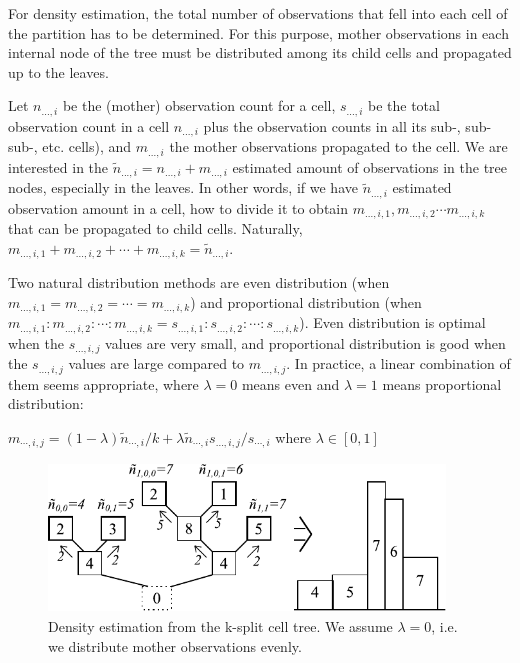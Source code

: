 For density estimation, the total number of observations that
fell into each cell of the partition has to be determined. For
this purpose, mother observations in each internal node of the
tree must be distributed among its child cells and propagated
up to the leaves.


Let $n_{...,i}$ be the (mother) observation count for a cell,
$s_{...,i}$ be the total observation count in a cell $n_{...,i}$ plus
the observation counts in all its sub-, sub-sub-, etc. cells), and
$m_{...,i}$ the mother observations propagated to the cell. We are
interested in the $\tilde{n}_{...,i} = n_{...,i} + m_{...,i}$
estimated amount of observations in the tree nodes, especially in the
leaves. In other words, if we have $\tilde{n}_{...,i}$ estimated
observation amount in a cell, how to divide it to obtain
$m_{...,i,1}, m_{...,i,2} \cdots m_{...,i,k}$
that can be propagated to child cells. Naturally,
$m_{...,i,1} + m_{...,i,2} + \cdots + m_{...,i,k} = \tilde{n}_{...,i}$.


Two natural distribution methods are even
distribution (when
$m_{...,i,1} = m_{...,i,2} = \cdots = m_{...,i,k}$) and proportional
distribution (when
$m_{...,i,1} : m_{...,i,2} : \cdots : m_{...,i,k} = s_{...,i,1} : s_{...,i,2} : \cdots : s_{...,i,k}$).
Even distribution is optimal when the
$s_{...,i,j}$ values are very small, and proportional distribution is
good when the $s_{...,i,j}$ values are large compared to
$m_{...,i,j}$. In practice, a linear combination of them seems
appropriate, where $\lambda=0$ means even and $\lambda=1$ means
proportional distribution:


$m_{\cdots,i,j} = (1-\lambda)\tilde{n}_{\cdots,i}/k + \lambda \tilde{n}_{\cdots,i} s_{...,i,j} / s_{\cdots,i}$
where $\lambda\in[0,1]$

\begin{figure}[htbp]
  \begin{center}
    \includegraphics[width=4.147in, height=1.567in]{figures/usmanFig16}
    \caption{Density estimation from the k-split cell tree. We
      assume $\lambda=0$, i.e. we distribute mother observations
      evenly.}
  \end{center}
\end{figure}

